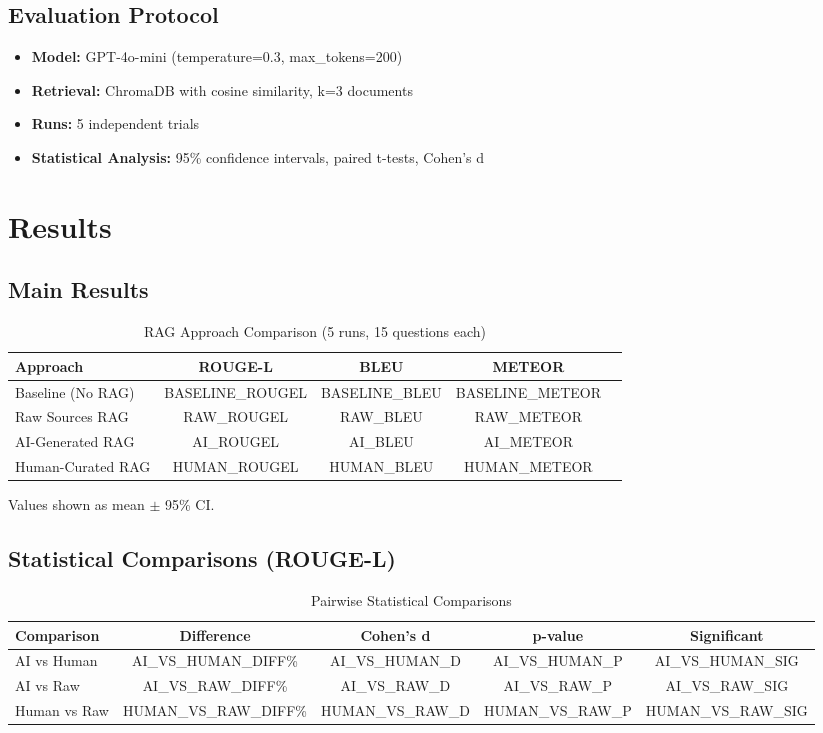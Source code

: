\documentclass{article}
\begin{document}
\subsection{Evaluation Protocol}
\begin{itemize}
    \item \textbf{Model:} GPT-4o-mini (temperature=0.3, max\_tokens=200)
    \item \textbf{Retrieval:} ChromaDB with cosine similarity, k=3 documents
    \item \textbf{Runs:} 5 independent trials
    \item \textbf{Statistical Analysis:} 95\% confidence intervals, paired t-tests, Cohen's d
\end{itemize}

\section{Results}

\subsection{Main Results}

\begin{table}[h]
\centering
\caption{RAG Approach Comparison (5 runs, 15 questions each)}
\begin{tabular}{lcccc}
\toprule
Approach & ROUGE-L & BLEU & METEOR \\
\midrule
Baseline (No RAG) & {{BASELINE_ROUGEL}} & {{BASELINE_BLEU}} & {{BASELINE_METEOR}} \\
Raw Sources RAG & {{RAW_ROUGEL}} & {{RAW_BLEU}} & {{RAW_METEOR}} \\
AI-Generated RAG & {{AI_ROUGEL}} & {{AI_BLEU}} & {{AI_METEOR}} \\
Human-Curated RAG & {{HUMAN_ROUGEL}} & {{HUMAN_BLEU}} & {{HUMAN_METEOR}} \\
\bottomrule
\end{tabular}
\label{tab:main_results}
\end{table}

Values shown as mean $\pm$ 95\% CI.

\subsection{Statistical Comparisons (ROUGE-L)}

\begin{table}[h]
\centering
\caption{Pairwise Statistical Comparisons}
\begin{tabular}{lcccc}
\toprule
Comparison & Difference & Cohen's d & p-value & Significant \\
\midrule
AI vs Human & {{AI_VS_HUMAN_DIFF}}\% & {{AI_VS_HUMAN_D}} & {{AI_VS_HUMAN_P}} & {{AI_VS_HUMAN_SIG}} \\
AI vs Raw & {{AI_VS_RAW_DIFF}}\% & {{AI_VS_RAW_D}} & {{AI_VS_RAW_P}} & {{AI_VS_RAW_SIG}} \\
Human vs Raw & {{HUMAN_VS_RAW_DIFF}}\% & {{HUMAN_VS_RAW_D}} & {{HUMAN_VS_RAW_P}} & {{HUMAN_VS_RAW_SIG}} \\
\bottomrule
\end{tabular}
\label{tab:statistical}
\end{table}
\end{document}
